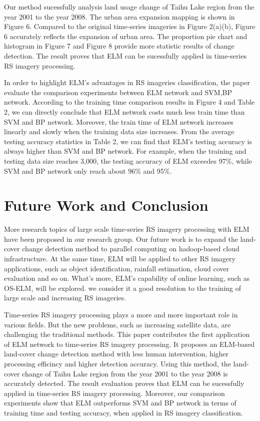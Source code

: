 \documentclass{elsart}
\begin{document}
Our method sucessfully analysis land usage change of Taihu Lake region from the year 2001 to the year 2008.
The urban area expansion mapping is shown in Figure 6.
Compared to the original time-series imageries in Figure 2(a)(b), Figure 6 accurately reflects the expansion of urban area. 
The proportion pie chart and histogram in Figure 7 and Figure 8 provide more statistic results of change detection.
The result proves that ELM can be sucessfully applied in time-series RS imagery processing.
\par 

In order to highlight ELM's advantages in RS imageries classification, the paper evaluate the comparison experiments between ELM network and SVM,BP network.
According to the training time comparison results in Figure 4 and Table 2, we can directly conclude that ELM network costs much less train time than SVM and BP network.
Moreover, the train time of ELM network increases linearly and slowly when the training data size increases.
From the average testing accuracy statistics in Table 2, we can find that ELM's testing accuracy is always higher than SVM and BP network.
For example, when the training and testing data size reaches 3,000, the testing accuracy of ELM exceedes 97\%, while SVM and BP network only reach about 96\% and 95\%.
\par

\section{Future Work and Conclusion}
More research topics of large scale time-series RS imagery processing with ELM have been proposed in our research group.
Our future work is to expand the land-cover change detection method to parallel computing on hadoop-based cloud infrastructure.
At the same time, ELM will be applied to other RS imagery applications, such as object identification, rainfall estimation, cloud cover evaluation and so on.
What's more, ELM's capability of online learning, such as OS-ELM, will be explored.
we consider it a good resolution to the training of large scale and increasing RS imageries. 
\par

Time-series RS imagery processing plays a more and more important role in various fields.
But the new problems, such as increasing satellite data, are challenging the traditional methods.
This paper contributes the first application of ELM network to time-series RS imagery processing.
It proposes an ELM-based land-cover change detection method with less human intervention, higher processing efficincy and higher detection accuracy.
Using this method, the land-cover change of Taihu Lake region from the year 2001 to the year 2008 is accurately detected.
The result evaluation proves that ELM can be sucessfully applied in time-series RS imagery processing.
Moreover, our comparison experiments show that ELM outperforms SVM and BP network in terms of training time and testing accuracy, when applied in RS imagery classification.
\par
\end{document}

